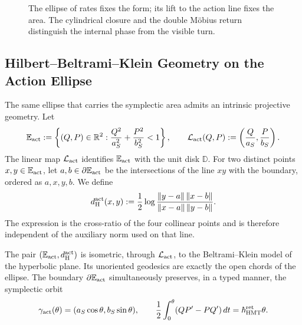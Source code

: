 \begin{figure}[htbp]
\centering
\resizebox{.98\textwidth}{!}{}
\caption{The ellipse of rates fixes the form; its lift to the action line fixes
the area. The cylindrical closure and the double Möbius return distinguish the internal phase
from the visible turn.}
\label{fig:elipse-accion-holonomia-rev8}
\end{figure}

\subsection{Hilbert--Beltrami--Klein Geometry on the Action Ellipse}
\label{sec:hilbert-beltrami-klein-elipse-accion}

The same ellipse that carries the symplectic area admits an intrinsic projective
geometry. Let
\[
 \mathbb E_{\rm act}
 :=\left\{(Q,P)\in\mathbb R^2:
 \frac{Q^2}{a_S^2}+\frac{P^2}{b_S^2}<1\right\},
 \qquad
 \mathcal L_{\rm act}(Q,P)
 :=\left(\frac{Q}{a_S},\frac{P}{b_S}\right).
\]
The linear map \(\mathcal L_{\rm act}\) identifies
\(\mathbb E_{\rm act}\) with the unit disk \(\mathbb D\). For two
distinct points \(x,y\in\mathbb E_{\rm act}\), let \(a,b\in\partial
\mathbb E_{\rm act}\) be the intersections of the line \(xy\) with the boundary,
ordered as \(a,x,y,b\). We define
\begin{equation}
 d_{\rm H}^{\rm act}(x,y)
 :=\frac12\log
 \frac{\lVert y-a\rVert\,\lVert x-b\rVert}
      {\lVert x-a\rVert\,\lVert y-b\rVert}.
 \label{eq:distancia-hilbert-elipse-accion}
\end{equation}
The expression is the cross-ratio of the four collinear points and is therefore
independent of the auxiliary norm used on that line.

\begin{proposition}
\label{prop:beltrami-klein-elipse-accion}
The pair \((\mathbb E_{\rm act},d_{\rm H}^{\rm act})\) is isometric, through
\(\mathcal L_{\rm act}\), to the Beltrami--Klein model of the hyperbolic plane.
Its unoriented geodesics are exactly the open chords of the
ellipse. The boundary \(\partial\mathbb E_{\rm act}\) simultaneously preserves, in a
typed manner, the symplectic orbit
\[
 \gamma_{\rm act}(\theta)
 =(a_S\cos\theta,b_S\sin\theta),
 \qquad
 \frac12\int_0^\theta(QP'-PQ')\,dt
 =\hbar_{\rm HMT}^{\rm ret}\theta.
\]
\end{proposition}

